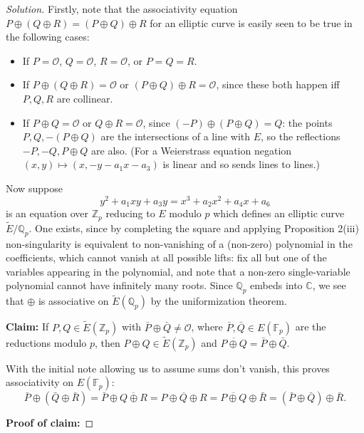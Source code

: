 \documentclass[a4paper]{article}
\theoremstyle{plain}
\theoremstyle{remark}
\theoremstyle{definition}
\renewcommand{\O}{\mathcal{O}}
\newcommand{\F}{\mathbb{F}}
\newcommand{\Z}{\mathbb{Z}}
\newcommand{\Q}{\mathbb{Q}}
\newcommand{\C}{\mathbb{C}}
\begin{document}
\begin{enumerate}
        \begin{proof}[Solution]
            Firstly, note that the associativity equation
            $P\oplus(Q\oplus R)=(P\oplus Q)\oplus R$ for an elliptic curve is
            easily seen to be true in the following cases:
            \begin{itemize}
                \item If $P=\O$, $Q=\O$, $R=\O$, or $P=Q=R$.
                \item If $P\oplus(Q\oplus R)=\O$ or $(P\oplus Q)\oplus R=\O$,
                    since these both happen iff $P,Q,R$ are collinear.
                \item If $P\oplus Q=\O$ or $Q\oplus R=\O$, since
                    $(-P)\oplus(P\oplus Q)=Q$: the points $P,Q,-(P\oplus Q)$ are
                    the intersections of a line with $E$, so the reflections
                    $-P,-Q,P\oplus Q$ are also. (For a Weierstrass equation
                    negation $(x,y)\mapsto(x,-y-a_1x-a_3)$ is linear and so
                    sends lines to lines.)
            \end{itemize}
            Now suppose
            \begin{equation*}
                y^2 + a_1xy + a_3y = x^3 + a_2x^2 + a_4x + a_6
            \end{equation*}
            is an equation over $\Z_p$ reducing to $E$ modulo $p$ which defines
            an elliptic curve $\tilde E/\Q_p$. One exists, since by completing
            the square and applying Proposition 2(iii) non-singularity is
            equivalent to non-vanishing of a (non-zero) polynomial in the
            coefficients, which cannot vanish at all possible lifts: fix all but
            one of the variables appearing in the polynomial, and note that a
            non-zero single-variable polynomial cannot have infinitely many
            roots. Since $\Q_p$ embeds into $\C$, we see that $\oplus$ is
            associative on $\tilde E(\Q_p)$ by the uniformization theorem.

            \textbf{Claim:} If $P,Q\in\tilde E(\Z_p)$ with
            $\bar P\oplus\bar Q\ne\O$, where $\bar P,\bar Q\in E(\F_p)$ are the
            reductions modulo $p$, then $P\oplus Q\in\tilde E(\Z_p)$ and
            $\overline{P\oplus Q}=\bar P\oplus\bar Q$.

            With the initial note allowing us to assume sums don't vanish, this
            proves associativity on $E(\F_p)$:
            \begin{equation*}
                \bar P\oplus(\bar Q\oplus\bar R)
                    = \bar P\oplus\overline{Q\oplus R}
                    = \overline{P\oplus Q\oplus R}
                    = \overline{P\oplus Q}\oplus\bar R
                    = (\bar P\oplus\bar Q)\oplus\bar R.
            \end{equation*}

            \textbf{Proof of claim:} %
        \end{proof}
\end{enumerate}
\end{document}
